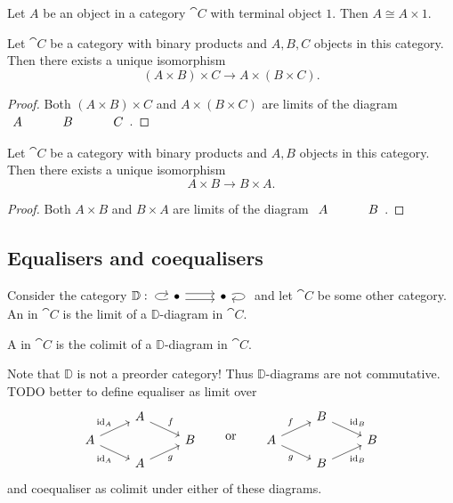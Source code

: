 \begin{lemma}
Let $A$ be an object in a category $\cat{C}$ with terminal object $1$. Then $A \cong A\times 1$.
\end{lemma}


\begin{proposition} \label{associatorTernaryProducts}
Let $\cat{C}$ be a category with binary products and $A,B,C$ objects in this category. Then there exists a unique isomorphism
\[ (A\times B)\times C \to A\times (B\times C). \]
\end{proposition}
\begin{proof}
Both $(A\times B)\times C$ and $A\times (B\times C)$ are limits of the diagram $\begin{tikzcd}
A & B & C
\end{tikzcd}$.
\end{proof}

\begin{proposition} \label{swapMorphism}
Let $\cat{C}$ be a category with binary products and $A,B$ objects in this category. Then there exists a unique isomorphism
\[ A\times B \to B\times A. \]
\end{proposition}
\begin{proof}
Both $A \times B$ and $B\times A$ are limits of the diagram $\begin{tikzcd}
A & B
\end{tikzcd}$.
\end{proof}

\subsection{Equalisers and coequalisers}
\begin{definition}
Consider the category $\mathbb{D}: \begin{tikzcd}
\bullet \ar[loop left] \ar[r, shift left] \ar[r, shift right] & \bullet \ar[loop right]
\end{tikzcd}$ and let $\cat{C}$ be some other category. An  in $\cat{C}$ is the limit of a $\mathbb{D}$-diagram in $\cat{C}$.

A  in $\cat{C}$ is the colimit of a $\mathbb{D}$-diagram in $\cat{C}$.
\end{definition}

Note that $\mathbb{D}$ is not a preorder category! Thus $\mathbb{D}$-diagrams are not commutative. TODO better to define equaliser as limit over
\[ \begin{tikzcd}[row sep=tiny]
{} & A \ar[dr, "f"] & {} \\
A \ar[ur, "{\id_A}"] \ar[dr, swap, "{\id_A}"] & {} & B \\
{} & A \ar[ur, swap, "g"] & {}
\end{tikzcd} \qquad\text{or}\qquad \begin{tikzcd}[row sep=tiny]
{} & B \ar[dr, "{\id_B}"] & {} \\
A \ar[ur, "f"] \ar[dr, swap, "g"] & {} & B \\
{} & B \ar[ur, swap, "{\id_B}"] & {}
\end{tikzcd} \]
and coequaliser as colimit under either of these diagrams.


